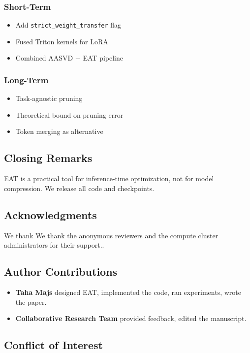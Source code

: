 \subsubsection{Short-Term}
\begin{itemize}
\item Add \texttt{strict\_weight\_transfer} flag
\item Fused Triton kernels for LoRA
\item Combined AASVD + EAT pipeline

\end{itemize}
\subsubsection{Long-Term}
\begin{itemize}
\item Task-agnostic pruning
\item Theoretical bound on pruning error
\item Token merging as alternative

\end{itemize}
\subsection{Closing Remarks}

EAT is a practical tool for inference-time optimization, not for model 
compression. We release all code and checkpoints.

\subsection{Acknowledgments}

We thank We thank the anonymous reviewers and the compute cluster administrators for their support..

\subsection{Author Contributions}

\begin{itemize}
\item \textbf{Taha Majs} designed EAT, implemented the code, ran experiments,
  wrote the paper.
\item \textbf{Collaborative Research Team} provided feedback, edited the manuscript.

\end{itemize}
\subsection{Conflict of Interest}


